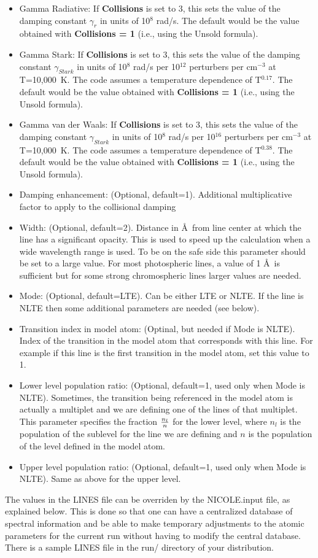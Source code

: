 \begin{itemize}
\item Gamma Radiative: If {\bf Collisions} is set to 3, this sets the
  value of the damping constant $\gamma_r$ in units of 10$^8$ rad/s. The
  default would be the value obtained with {\bf Collisions = 1} (i.e.,
  using the Unsold formula).
\item Gamma Stark: If {\bf Collisions} is set to 3, this sets the
  value of the damping constant $\gamma_{Stark}$ in units of 10$^8$
  rad/s per 10$^{12}$ perturbers per cm$^{-3}$ at T=10,000~K. The code
  assumes a temperature dependence of T$^{0.17}$. The default would be
  the value obtained with {\bf Collisions = 1} (i.e., using the Unsold
  formula).
\item Gamma van der Waals: If {\bf Collisions} is set to 3, this sets
  the value of the damping constant $\gamma_{Stark}$ in units of 10$^8$
  rad/s per 10$^{16}$ perturbers per cm$^{-3}$ at T=10,000~K. The code
  assumes a temperature dependence of T$^{0.38}$. The default would be
  the value obtained with {\bf Collisions = 1} (i.e., using the Unsold
  formula).
\item Damping enhancement: (Optional, default=1). Additional multiplicative
  factor to apply to the collisional damping
\item Width: (Optional, default=2). Distance in \AA \, from line center
  at which the line has a significant opacity. This is used to speed
  up the calculation when a wide wavelength range is used. To be on
  the safe side this parameter should be set to a large value. For
  most photospheric lines, a value of 1 \AA \, is sufficient but for
  some strong chromospheric lines larger values are needed.
\item Mode: (Optional, default=LTE). Can be either LTE or NLTE. If the
  line is NLTE then some additional parameters are needed (see below).
\item Transition index in model atom: (Optinal, but needed if Mode is
  NLTE). Index of the transition in the model atom that corresponds
  with this line. For example if this line is the first transition in
  the model atom, set this value to 1.
\item Lower level population ratio: (Optional, default=1, used only
  when Mode is NLTE). Sometimes, the transition being referenced in
  the model atom is actually a multiplet and we are defining one of
  the lines of that multiplet. This parameter specifies the fraction
  $n_l \over n$ for the lower level, where $n_l$ is the population of
  the sublevel for the line we are defining and $n$ is the population
  of the level defined in the model atom.
\item Upper level population ratio: (Optional, default=1, used only
  when Mode is NLTE). Same as above for the upper level.
\end{itemize}
The values in the LINES file can be overriden by the NICOLE.input
file, as explained below. This is done so that one can have a
centralized database of spectral information and be able to make
temporary adjustments to the atomic parameters for the current run
without having to modify the central database. There is a sample LINES
file in the run/ directory of your distribution.

